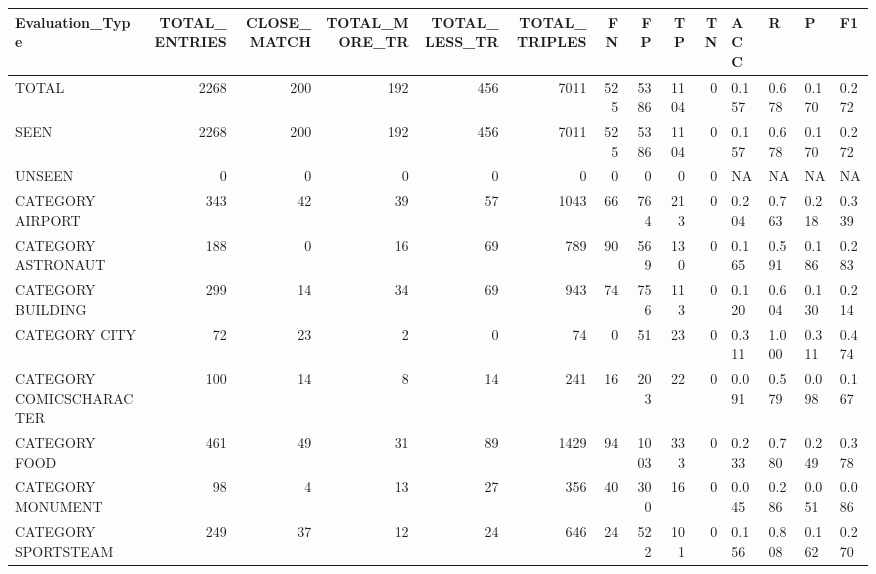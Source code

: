\begin{tabular}{lrrrrrrrrrllll}
\hline
 Evaluation\_Type          &   TOTAL\_ENTRIES &   CLOSE\_MATCH &   TOTAL\_MORE\_TR &   TOTAL\_LESS\_TR &   TOTAL\_TRIPLES &   FN &   FP &   TP &   TN & ACC   & R     & P     & F1    \\
\hline
 TOTAL                    &            2268 &           200 &             192 &             456 &            7011 &  525 & 5386 & 1104 &    0 & 0.157 & 0.678 & 0.170 & 0.272 \\
 SEEN                     &            2268 &           200 &             192 &             456 &            7011 &  525 & 5386 & 1104 &    0 & 0.157 & 0.678 & 0.170 & 0.272 \\
 UNSEEN                   &               0 &             0 &               0 &               0 &               0 &    0 &    0 &    0 &    0 & NA    & NA    & NA    & NA    \\
 CATEGORY AIRPORT         &             343 &            42 &              39 &              57 &            1043 &   66 &  764 &  213 &    0 & 0.204 & 0.763 & 0.218 & 0.339 \\
 CATEGORY ASTRONAUT       &             188 &             0 &              16 &              69 &             789 &   90 &  569 &  130 &    0 & 0.165 & 0.591 & 0.186 & 0.283 \\
 CATEGORY BUILDING        &             299 &            14 &              34 &              69 &             943 &   74 &  756 &  113 &    0 & 0.120 & 0.604 & 0.130 & 0.214 \\
 CATEGORY CITY            &              72 &            23 &               2 &               0 &              74 &    0 &   51 &   23 &    0 & 0.311 & 1.000 & 0.311 & 0.474 \\
 CATEGORY COMICSCHARACTER &             100 &            14 &               8 &              14 &             241 &   16 &  203 &   22 &    0 & 0.091 & 0.579 & 0.098 & 0.167 \\
 CATEGORY FOOD            &             461 &            49 &              31 &              89 &            1429 &   94 & 1003 &  333 &    0 & 0.233 & 0.780 & 0.249 & 0.378 \\
 CATEGORY MONUMENT        &              98 &             4 &              13 &              27 &             356 &   40 &  300 &   16 &    0 & 0.045 & 0.286 & 0.051 & 0.086 \\
 CATEGORY SPORTSTEAM      &             249 &            37 &              12 &              24 &             646 &   24 &  522 &  101 &    0 & 0.156 & 0.808 & 0.162 & 0.270 \\

\end{tabular}
